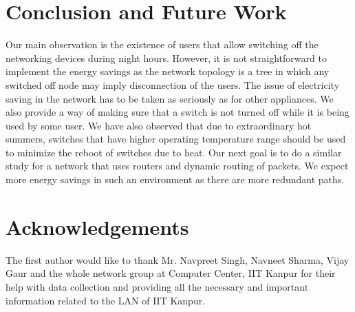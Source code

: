 \documentclass{article}
\begin{document}
\section{Conclusion and Future Work} 
\label{sec:conclusion}
Our main observation is the existence of users that allow switching off the networking devices during night hours. However, it is not straightforward to implement the energy savings as the network topology is a tree in which any switched off node may imply disconnection of the users. The issue of electricity saving in the network has to be taken as seriously as for other appliances. We also provide a way of making sure that a switch is not turned off while it is being used by some user. We have also observed that due to extraordinary hot summers, switches that have higher operating temperature range should be used to minimize the reboot of switches due to heat. Our next goal is to do a similar study for a network that uses routers and dynamic routing of packets. We expect more energy savings in such an environment as there are more redundant paths. 

 


\section*{Acknowledgements}
The first author would like to thank Mr. Navpreet Singh, Navneet Sharma, Vijay Gaur and the whole network group at Computer Center, IIT Kanpur for their help with data collection and providing all the necessary and important information related to the LAN of IIT Kanpur.




\end{document}
